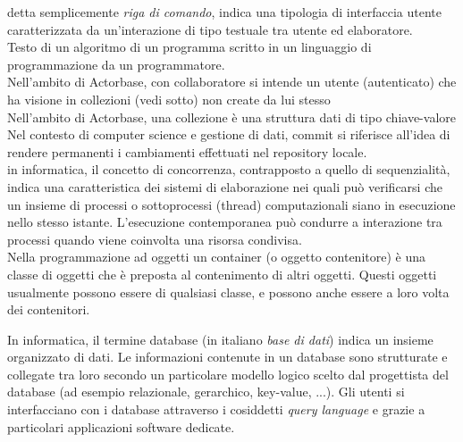 \documentclass{scalatekids-article}
\begin{document}
 detta semplicemente \textit{riga di comando}, indica una tipologia di interfaccia utente caratterizzata da un'interazione di tipo testuale tra utente ed elaboratore.
\\

 Testo di un algoritmo di un programma scritto in un linguaggio di programmazione da un programmatore.
\\

 Nell'ambito di Actorbase, con collaboratore si intende un utente (autenticato) che ha visione in collezioni (vedi sotto)  non create da lui stesso
\\

 Nell'ambito di Actorbase, una collezione è una struttura dati di tipo chiave-valore
\\

 Nel contesto di computer science e gestione di dati, commit si riferisce all'idea di rendere permanenti i cambiamenti effettuati nel repository locale.
\\

 in informatica, il concetto di concorrenza, contrapposto a quello di sequenzialità, indica una caratteristica dei sistemi di elaborazione nei quali può verificarsi che un insieme di processi o sottoprocessi (thread) computazionali siano in esecuzione nello stesso istante.
L'esecuzione contemporanea può condurre a interazione tra processi quando viene coinvolta una risorsa condivisa.
\\

 Nella programmazione ad oggetti un container (o oggetto contenitore) è una classe di oggetti che è preposta al contenimento di altri oggetti.
Questi oggetti usualmente possono essere di qualsiasi classe, e possono anche essere a loro volta dei contenitori.
\\


 In informatica, il termine database (in italiano \textit{base di dati}) indica un insieme organizzato di dati.
Le informazioni contenute in un database sono strutturate e collegate tra loro secondo un particolare modello logico scelto dal progettista del database (ad esempio relazionale, gerarchico, key-value, ...).
Gli utenti si interfacciano con i database attraverso i cosiddetti \textit{query language} e grazie a particolari applicazioni software dedicate.
\\
\end{document}
